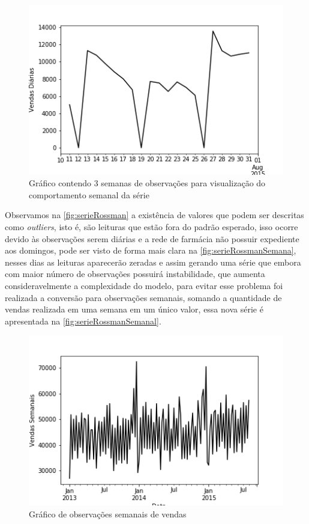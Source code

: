 \documentclass[
    12pt,
    oneside,
    a4paper,
    english,
    brazil
]{abntex2}
\begin{document}
\begin{figure}[ht]
    \centering
    \caption{Gráfico contendo 3 semanas de observações para visualização do
        comportamento semanal da série}\label{fig:serieRossmanSemana}
    \includegraphics[width=.6\textwidth]{images/graficoRossmanSemana.png}
\end{figure}

Observamos na \autoref{fig:serieRossman} a existência de valores que podem ser
descritas como \textit{outliers}, isto é, são leituras que estão fora do padrão
esperado, isso ocorre devido às observações serem diárias e a rede de farmácia
não possuir expediente aos domingos, pode ser visto de forma mais clara na
\autoref{fig:serieRossmanSemana}, nesses dias as leituras aparecerão zeradas e
assim gerando uma série que embora com maior número de observações possuirá
instabilidade, que aumenta consideravelmente a complexidade do modelo, para
evitar esse problema foi realizada a conversão para observações semanais,
somando a quantidade de vendas realizada em uma semana em um único valor, essa
nova série é apresentada na \autoref{fig:serieRossmanSemanal}.

\begin{figure}[ht]
    \centering
    \caption{Gráfico de observações semanais de
        vendas}\label{fig:serieRossmanSemanal}
    \includegraphics[width=.6\textwidth]{images/graficoRossmanSemanal.png}
\end{figure}
\end{document}
